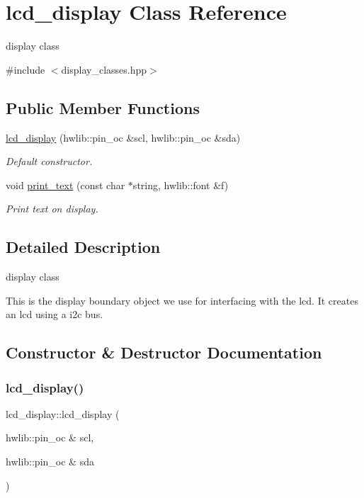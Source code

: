 \hypertarget{classlcd__display}{}\section{lcd\+\_\+display Class Reference}
\label{classlcd__display}


display class  




{\ttfamily \#include $<$display\+\_\+classes.\+hpp$>$}

\subsection*{Public Member Functions}
\begin{DoxyCompactItemize}
\item 
\hyperlink{classlcd__display_a381883b15868b9276823270421bb2f6f}{lcd\+\_\+display} (hwlib\+::pin\+\_\+oc \&scl, hwlib\+::pin\+\_\+oc \&sda)
\begin{DoxyCompactList}\small\item\em Default constructor. \end{DoxyCompactList}\item 
void \hyperlink{classlcd__display_a74fc3a72c343a01fdc6169158bb02200}{print\+\_\+text} (const char $\ast$string, hwlib\+::font \&f)
\begin{DoxyCompactList}\small\item\em Print text on display. \end{DoxyCompactList}\end{DoxyCompactItemize}


\subsection{Detailed Description}
display class 

This is the display boundary object we use for interfacing with the lcd. It creates an lcd using a i2c bus. 

\subsection{Constructor \& Destructor Documentation}
\hypertarget{classlcd__display_a381883b15868b9276823270421bb2f6f}{}\label{classlcd__display_a381883b15868b9276823270421bb2f6f} 
\subsubsection{\texorpdfstring{lcd\+\_\+display()}{lcd\_display()}}
{\footnotesize\ttfamily lcd\+\_\+display\+::lcd\+\_\+display (\begin{DoxyParamCaption}\item[{hwlib\+::pin\+\_\+oc \&}]{scl,  }\item[{hwlib\+::pin\+\_\+oc \&}]{sda }\end{DoxyParamCaption})\hspace{0.3cm}{\ttfamily [inline]}}




